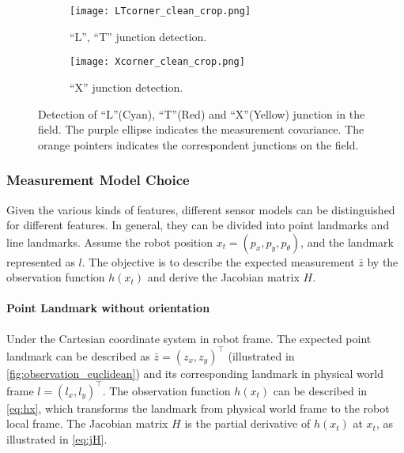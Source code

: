 \begin{figure}[h!]
  \hspace*{\fill}
  \begin{subfigure}[b]{0.4\textwidth}
    \texttt{[image: LTcorner\_clean\_crop.png]}
    \caption{``L'', ``T'' junction detection.}
    \label{fig:LT}
  \end{subfigure}
  \hspace*{\fill}
  \begin{subfigure}[b]{0.381\textwidth}
    \texttt{[image: Xcorner\_clean\_crop.png]}
    \caption{``X'' junction detection.}
    \label{fig:X}
  \end{subfigure}
  \hspace*{\fill}
 \caption[Detection of ``L'', ``T'' and ``X'' junction in the field.]{Detection of ``L''(Cyan), ``T''(Red) and ``X''(Yellow) junction in the field. The purple ellipse indicates the measurement covariance. The orange pointers indicates the correspondent junctions on the field.}
  \label{fig:txcorner}
\end{figure}


\subsubsection{Measurement Model Choice}\label{subsub:sensorModelChoice}
Given the various kinds of features, different sensor models can be distinguished for different features. In general, they can be divided into point landmarks and line landmarks. Assume the robot position $x_t = (p_x, p_y, p_{\theta})$, and the landmark represented as $l$. The objective is to describe the expected measurement $\bar{z}$ by the observation function $h(x_t)$ and derive the Jacobian matrix $H$.
\paragraph{Point Landmark without orientation}\label{par:pointLandmark}
Under the Cartesian coordinate system in robot frame. The expected point landmark can be described as $\bar{z} = (z_x, z_y)^\top$ (illustrated in \autoref{fig:observation_euclidean}) and its corresponding landmark in physical world frame $l = (l_x, l_y)^\top$. The observation function $h(x_t)$ can be described in \autoref{eq:hx}, which transforms the landmark from physical world frame to the robot local frame. The Jacobian matrix $H$ is the partial derivative of $h(x_t)$ at $x_t$, as illustrated in \autoref{eq:jH}. 

